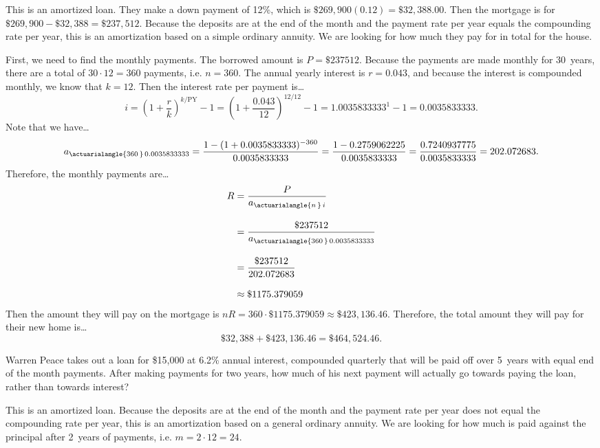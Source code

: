 \documentclass[11pt,letterpaper]{article}
\begin{document}
\sol This is an amortized loan. They make a down payment of 12\%, which is $\$269,900(0.12)= \$32,388.00$. Then the mortgage is for $\$269,900 - \$32,388= \$237,512$. Because the deposits are at the end of the month and the payment rate per year equals the compounding rate per year, this is an amortization based on a simple ordinary annuity. We are looking for how much they pay for in total for the house. \pspace

First, we need to find the monthly payments. The borrowed amount is $P= \$237512$. Because the payments are made monthly for 30~years, there are a total of $30 \cdot 12= 360$ payments, i.e. $n= 360$. The annual yearly interest is $r= 0.043$, and because the interest is compounded monthly, we know that $k= 12$. Then the interest rate per payment is\dots \pspace
	\[
	i= \left( 1 + \dfrac{r}{k} \right)^{k/\text{PY}} - 1= \left( 1 + \dfrac{0.043}{12} \right)^{12/12} - 1= 1.0035833333^1 - 1= 0.0035833333.
	\] \pspace
Note that we have\dots \pspace
	\[
	a_{\actuarialangle{360\,}\, 0.0035833333}= \dfrac{1 - (1 + 0.0035833333)^{-360}}{0.0035833333}= \dfrac{1 - 0.2759062225}{0.0035833333}= \dfrac{0.7240937775}{0.0035833333}= 202.072683.
	\] \pspace
Therefore, the monthly payments are\dots \pspace
	\[
	\begin{aligned}
	R&= \dfrac{P}{a_{\actuarialangle{n\,}\, i}} \\[0.3cm]
	&= \dfrac{\$237512}{a_{\actuarialangle{360\,}\, 0.0035833333}} \\[0.3cm]
	&= \dfrac{\$237512}{202.072683} \\[0.3cm]
	&\approx \$1175.379059
	\end{aligned}
	\] \pspace
Then the amount they will pay on the mortgage is $nR= 360 \cdot \$1175.379059 \approx \$423,136.46$. Therefore, the total amount they will pay for their new home is\dots \pspace
	\[
	\$32,388 + \$423,136.46= \$464,524.46.
	\]



\newpage



 Warren Peace takes out a loan for \$15,000 at 6.2\% annual interest, compounded quarterly that will be paid off over 5~years with equal end of the month payments. After making payments for two years, how much of his next payment will actually go towards paying the loan, rather than towards interest? \pspace

\sol This is an amortized loan. Because the deposits are at the end of the month and the payment rate per year does not equal the compounding rate per year, this is an amortization based on a general ordinary annuity. We are looking for how much is paid against the principal after 2~years of payments, i.e. $m= 2 \cdot 12= 24$. \pspace
\end{document}

